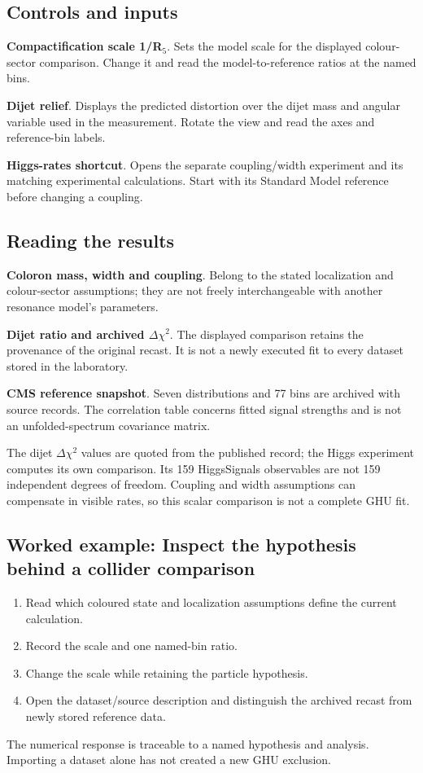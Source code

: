 \documentclass[11pt,a4paper]{article}
\begin{document}
\subsection*{Controls and inputs}
\textbf{Compactification scale 1/R\ensuremath{{}_{5}}}. Sets the model scale for the displayed colour-sector comparison. Change it and read the model-to-reference ratios at the named bins.

\textbf{Dijet relief}. Displays the predicted distortion over the dijet mass and angular variable used in the measurement. Rotate the view and read the axes and reference-bin labels.

\textbf{Higgs-rates shortcut}. Opens the separate coupling/width experiment and its matching experimental calculations. Start with its Standard Model reference before changing a coupling.

\subsection*{Reading the results}
\textbf{Coloron mass, width and coupling}. Belong to the stated localization and colour-sector assumptions; they are not freely interchangeable with another resonance model's parameters.

\textbf{Dijet ratio and archived \ensuremath{\Delta}\ensuremath{\chi}\ensuremath{{}^{2}}}. The displayed comparison retains the provenance of the original recast. It is not a newly executed fit to every dataset stored in the laboratory.

\textbf{CMS reference snapshot}. Seven distributions and 77 bins are archived with source records. The correlation table concerns fitted signal strengths and is not an unfolded-spectrum covariance matrix.

The dijet \ensuremath{\Delta}\ensuremath{\chi}\ensuremath{{}^{2}} values are quoted from the published record; the Higgs experiment computes its own comparison. Its 159 HiggsSignals observables are not 159 independent degrees of freedom. Coupling and width assumptions can compensate in visible rates, so this scalar comparison is not a complete GHU fit.
\subsection*{Worked example: Inspect the hypothesis behind a collider comparison}
\begin{enumerate}
\item Read which coloured state and localization assumptions define the current calculation.
\item Record the scale and one named-bin ratio.
\item Change the scale while retaining the particle hypothesis.
\item Open the dataset/source description and distinguish the archived recast from newly stored reference data.
\end{enumerate}
The numerical response is traceable to a named hypothesis and analysis. Importing a dataset alone has not created a new GHU exclusion.
\end{document}
